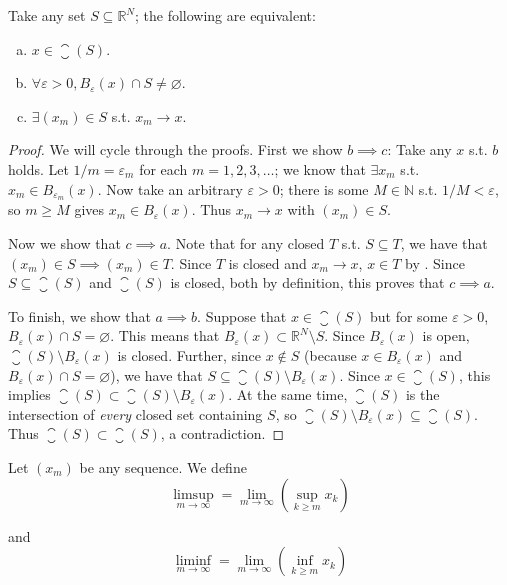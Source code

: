\documentclass{article}
\begin{document}
\begin{theorem}
  Take any set $S \subseteq \mathbb{R}^N$; the following are equivalent:
  \begin{enumerate}[a)]
    \item $x \in \closure(S)$.
    \item $\forall \varepsilon > 0, B_{\varepsilon}(x) \cap S \ne \varnothing$.
    \item $\exists (x_m) \in S$ s.t. $x_m \to x$.
  \end{enumerate}
\end{theorem}

\begin{proof}
  We will cycle through the proofs. First we show $b \implies c$: Take any $x$ s.t. $b$ holds. Let $1/m = \varepsilon_m$ for each $m = 1, 2, 3, \ldots$; we know that $\exists x_m$ s.t. $x_m \in B_{\varepsilon_m}(x)$. Now take an arbitrary $\varepsilon > 0$; there is some $M \in \mathbb{N}$ s.t. $1 / M < \varepsilon$, so $m \ge M$ gives $x_m \in B_{\varepsilon}(x)$. Thus $x_m \to x$ with $(x_m) \in S$.

  Now we show that $c \implies a$. Note that for any closed $T$ s.t. $S \subseteq T$, we have that $(x_m) \in S \implies (x_m) \in T$. Since $T$ is closed and $x_m \to x$, $x \in T$ by . Since $S \subseteq \closure(S)$ and $\closure(S)$ is closed, both by definition, this proves that $c \implies a$.

  To finish, we show that $a \implies b$. Suppose that $x \in \closure(S)$ but for some $\varepsilon > 0$, $B_{\varepsilon}(x) \cap S = \varnothing$. This means that $B_{\varepsilon}(x) \subset \mathbb{R}^N \setminus S$. Since $B_{\varepsilon}(x)$ is open, $\closure(S) \setminus B_{\varepsilon}(x)$ is closed. Further, since $x \notin S$ (because $x \in B_{\varepsilon}(x)$ and $B_{\varepsilon}(x) \cap S = \varnothing$), we have that $S \subseteq \closure(S) \setminus B_{\varepsilon}(x)$.  Since $x \in \closure(S)$, this implies $\closure(S) \subset \closure(S) \setminus B_{\varepsilon}(x)$. At the same time, $\closure(S)$ is the intersection of \textit{every} closed set containing $S$, so $\closure(S) \setminus B_{\varepsilon}(x) \subseteq \closure(S)$. Thus $\closure(S) \subset \closure(S)$, a contradiction.
\end{proof}

\begin{definition}
  Let $(x_m)$ be any sequence. We define
  \[
    \limsup_{m \to \infty} = \lim_{m \to \infty} \left(\sup_{k \ge m} x_k\right)
  \]

  and
  \[
    \liminf_{m \to \infty} = \lim_{m \to \infty} \left(\inf_{k \ge m} x_k\right)
  \]
\end{definition}
\end{document}

